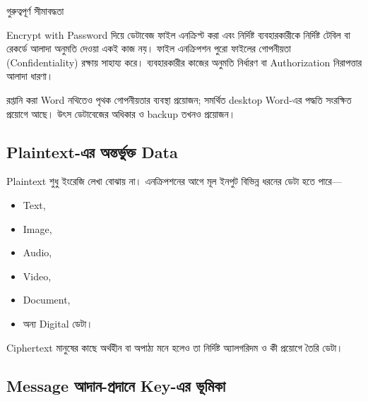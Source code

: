 \begin{keypointbox}{গুরুত্বপূর্ণ সীমাবদ্ধতা}

Encrypt with Password দিয়ে ডেটাবেজ ফাইল এনক্রিপ্ট করা এবং নির্দিষ্ট ব্যবহারকারীকে নির্দিষ্ট টেবিল বা রেকর্ডে আলাদা অনুমতি দেওয়া একই কাজ নয়। ফাইল এনক্রিপশন পুরো ফাইলের গোপনীয়তা (Confidentiality) রক্ষায় সাহায্য করে। ব্যবহারকারীর কাজের অনুমতি নির্ধারণ বা Authorization নিরাপত্তার আলাদা ধারণা।

\end{keypointbox}



রপ্তানি করা Word নথিতেও পৃথক গোপনীয়তার ব্যবস্থা প্রয়োজন; সমর্থিত desktop Word-এর পদ্ধতি সংরক্ষিত প্রয়োগে আছে। উৎস ডেটাবেজের অধিকার ও backup তখনও প্রয়োজন।

\subsection{Plaintext-এর অন্তর্ভুক্ত Data}

Plaintext শুধু ইংরেজি লেখা বোঝায় না। এনক্রিপশনের আগে মূল ইনপুট বিভিন্ন ধরনের ডেটা হতে পারে—

\begin{itemize}
    \item Text,
    \item Image,
    \item Audio,
    \item Video,
    \item Document,
    \item অন্য Digital ডেটা।
\end{itemize}


Ciphertext মানুষের কাছে অর্থহীন বা অপাঠ্য মনে হলেও তা নির্দিষ্ট অ্যালগরিদম ও কী প্রয়োগে তৈরি ডেটা।



\subsection{Message আদান-প্রদানে Key-এর ভূমিকা}

